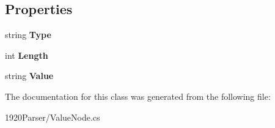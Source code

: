 \subsection*{Properties}
\begin{DoxyCompactItemize}
\item 
string {\bfseries Type}\hypertarget{class__1920_parser_1_1_value_node_af246d6039acc23ab38b0a1b9ed741465}{}\label{class__1920_parser_1_1_value_node_af246d6039acc23ab38b0a1b9ed741465}

\item 
int {\bfseries Length}\hypertarget{class__1920_parser_1_1_value_node_a373a059abbf96d88126a677665d20d9e}{}\label{class__1920_parser_1_1_value_node_a373a059abbf96d88126a677665d20d9e}

\item 
string {\bfseries Value}\hypertarget{class__1920_parser_1_1_value_node_a56cb68d4bb4856747b88651e874d1dcd}{}\label{class__1920_parser_1_1_value_node_a56cb68d4bb4856747b88651e874d1dcd}

\end{DoxyCompactItemize}


The documentation for this class was generated from the following file\+:\begin{DoxyCompactItemize}
\item 
1920\+Parser/Value\+Node.\+cs\end{DoxyCompactItemize}
